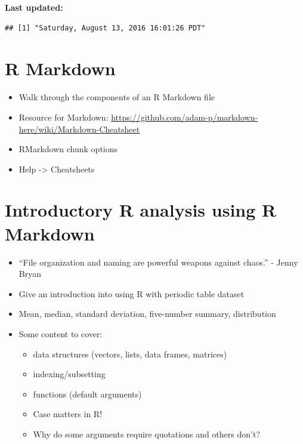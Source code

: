 \documentclass[]{tufte-book}
\providecommand{\tightlist}{%
  \setlength{\itemsep}{0pt}\setlength{\parskip}{0pt}}
\begin{document}
\textbf{Last updated:}

\begin{verbatim}
## [1] "Saturday, August 13, 2016 16:01:26 PDT"
\end{verbatim}

\chapter{R Markdown}\label{rmarkdown}

\begin{itemize}
\tightlist
\item
  Walk through the components of an R Markdown file
\item
  Resource for Markdown:
  \url{https://github.com/adam-p/markdown-here/wiki/Markdown-Cheatsheet}
\item
  RMarkdown chunk options
\item
  Help -\textgreater{} Cheatsheets
\end{itemize}

\chapter{Introductory R analysis using R Markdown}\label{rmdanal}

\begin{itemize}
\tightlist
\item
  ``File organization and naming are powerful weapons against chaos.'' -
  Jenny Bryan
\item
  Give an introduction into using R with periodic table dataset
\item
  Mean, median, standard deviation, five-number summary, distribution
\item
  Some content to cover:

  \begin{itemize}
  \tightlist
  \item
    data structures (vectors, lists, data frames, matrices)
  \item
    indexing/subsetting
  \item
    functions (default arguments)
  \item
    Case matters in R!
  \item
    Why do some arguments require quotations and others don't?
  \end{itemize}
\end{itemize}


\end{document}
